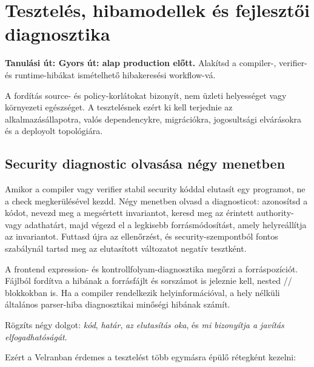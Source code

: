 \chapter{Tesztelés, hibamodellek és fejlesztői diagnosztika}

\noindent\textbf{Tanulási út: Gyors út: alap production előtt.} Alakítsd a compiler-, verifier- és runtime-hibákat ismételhető hibakeresési workflow-vá.\par\medskip


A fordítás source- és policy-korlátokat bizonyít, nem üzleti helyességet vagy környezeti egészséget. A tesztelésnek ezért ki kell terjednie az alkalmazásállapotra, valós dependencykre, migrációkra, jogosultsági elvárásokra és a deployolt topológiára.

\section{Security diagnostic olvasása négy menetben}

Amikor a compiler vagy verifier stabil security kóddal elutasít egy programot, ne a check megkerülésével kezdd. Négy menetben olvasd a diagnosticot: azonosítsd a kódot, nevezd meg a megsértett invariantot, keresd meg az érintett authority- vagy adathatárt, majd végezd el a legkisebb forrásmódosítást, amely helyreállítja az invariantot. Futtasd újra az ellenőrzést, és security-szempontból fontos szabálynál tartsd meg az elutasított változatot negatív tesztként.

A frontend expression- és kontrollfolyam-diagnosztika megőrzi a forráspozíciót. Fájlból fordítva a hibának a forrásfájlt és sorszámot is jeleznie kell, nested // blokkokban is. Ha a compiler rendelkezik helyinformációval, a hely nélküli általános parser-hiba diagnosztikai minőségi hibának számít.

Rögzíts négy dolgot: \emph{kód}, \emph{határ}, \emph{az elutasítás oka}, és \emph{mi bizonyítja a javítás elfogadhatóságát}.

Ezért a Velranban érdemes a tesztelést több egymásra épülő rétegként kezelni:

